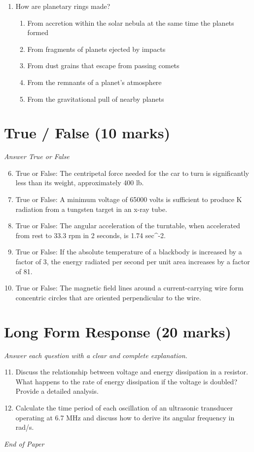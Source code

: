 \documentclass[12pt]{article}
\begin{document}
\begin{enumerate}[label=\arabic*.]
\begin{enumerate}[label=(\alph*)]
    \item 0.65
    \item 0.50
\end{enumerate}
\item How are planetary rings made?
\begin{enumerate}[label=(\alph*)]
    \item From accretion within the solar nebula at the same time the planets formed
    \item From fragments of planets ejected by impacts
    \item From dust grains that escape from passing comets
    \item From the remnants of a planet's atmosphere
    \item From the gravitational pull of nearby planets
\end{enumerate}
\end{enumerate}

\section*{True / False (10 marks)}
\textit{Answer True or False}
\begin{enumerate}[label=\arabic*.]
\setcounter{enumi}{5}
\item True or False: The centripetal force needed for the car to turn is significantly less than its weight, approximately 400 lb.
\item True or False: A minimum voltage of 65000 volts is sufficient to produce K radiation from a tungsten target in an x-ray tube.
\item True or False: The angular acceleration of the turntable, when accelerated from rest to 33.3 rpm in 2 seconds, is 1.74 sec^-2.
\item True or False: If the absolute temperature of a blackbody is increased by a factor of 3, the energy radiated per second per unit area increases by a factor of 81.
\item True or False: The magnetic field lines around a current-carrying wire form concentric circles that are oriented perpendicular to the wire.
\end{enumerate}

\section*{Long Form Response (20 marks)}
\textit{Answer each question with a clear and complete explanation.}
\begin{enumerate}[label=\arabic*.]
\setcounter{enumi}{10}
\item Discuss the relationship between voltage and energy dissipation in a resistor. What happens to the rate of energy dissipation if the voltage is doubled? Provide a detailed analysis.
\item Calculate the time period of each oscillation of an ultrasonic transducer operating at 6.7 MHz and discuss how to derive its angular frequency in rad/s.
\end{enumerate}

\vfill
\noindent\textit{End of Paper}
\end{document}
